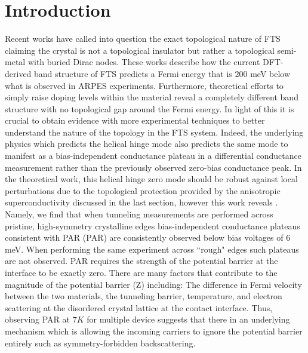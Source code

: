 \section{Introduction}
Recent works have called into question the exact topological nature of \ac{FTS} claiming the crystal is not a topological insulator but rather a topological semi-metal with buried Dirac nodes\cite{Borisenko2020}. These works describe how the current DFT-derived band structure of \ac{FTS} predicts a Fermi energy that is 200 meV below what is observed in ARPES experiments. Furthermore, theoretical efforts to simply raise doping levels within the material reveal a completely different band structure with no topological gap around the Fermi energy. In light of this it is crucial to obtain evidence with more experimental techniques to better understand the nature of the topology in the \ac{FTS} system. Indeed, the underlying physics which predicts the helical hinge mode also predicts the same mode to manifest as a bias-independent conductance plateau in a differential conductance measurement rather than the previously observed zero-bias conductance peak\cite{DasSarma2018, Gray2019}. In the theoretical work, this helical hinge zero mode should be robust against local perturbations due to the topological protection provided by the anisotropic superconductivity discussed in the last section, however this work reveals . Namely, we find that when tunneling measurements are performed across pristine, high-symmetry crystalline edges bias-independent conductance plateaus consistent with \acl{PAR} (PAR) are consistently observed below bias voltages of 6 meV. When performing the same experiment across ``rough" edges such plateaus are not observed. \ac{PAR} requires the strength of the potential barrier at the interface to be exactly zero. There are many factors that contribute to the magnitude of the potential barrier (Z) including: The difference in Fermi velocity between the two materials, the tunneling barrier, temperature, and electron scattering at the disordered crystal lattice at the contact interface\cite{Naidyuk2018}. Thus, observing \ac{PAR} at $7 K$ for multiple device suggests that there in an underlying mechanism which is allowing the incoming carriers to ignore the potential barrier entirely such as symmetry-forbidden backscattering.\cite{Lee2019} 

